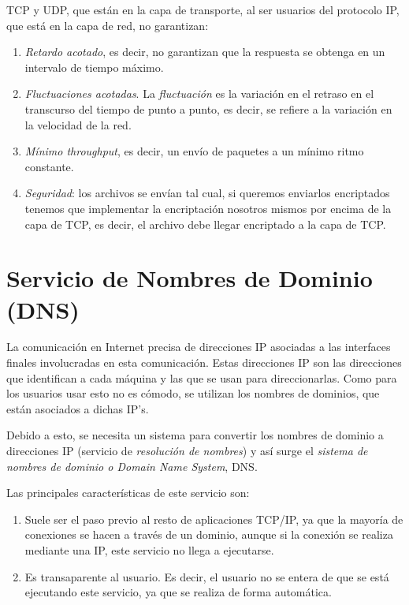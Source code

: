 \documentclass[10pt,a4paper,spanish]{report}
\begin{document}
TCP y UDP, que están en la capa de transporte, al ser usuarios del protocolo IP, que está en la capa de red, no garantizan:
\begin{enumerate}[\color{tema2}{$\bullet$}]
  \item \textit{\textcolor{tema2}{Retardo acotado}}, es decir, no garantizan que la respuesta se obtenga en un intervalo de tiempo máximo.
  \item \textit{\textcolor{tema2}{Fluctuaciones acotadas}}. La \textit{\textcolor{tema2}{fluctuación}} es  la variación en el retraso en el transcurso del tiempo de punto a punto, es decir, se refiere a la variación en la velocidad de la red.
  \item \textit{\textcolor{tema2}{Mínimo throughput}}, es decir, un envío de paquetes a  un mínimo ritmo constante.
  \item \textit{\textcolor{tema2}{Seguridad}}: los archivos se envían tal cual, si queremos enviarlos encriptados tenemos que implementar la encriptación nosotros mismos por encima de la capa de TCP, es decir, el archivo debe llegar encriptado a la capa de TCP.
\end{enumerate}

\section{\textcolor{tema2}Servicio de Nombres de Dominio (DNS)}

La comunicación en Internet precisa de direcciones IP asociadas a las interfaces finales involucradas en esta comunicación. Estas direcciones IP son las direcciones que identifican a cada máquina y las que se usan para direccionarlas. Como para los usuarios usar esto no es cómodo, se utilizan los nombres de dominios, que están asociados a dichas IP's. 

Debido a esto, se necesita un sistema para convertir los nombres de dominio a direcciones IP (servicio de \textit{\textcolor{tema2}{resolución de nombres}}) y así surge el \textit{\textcolor{tema2}{sistema de nombres de dominio o Domain Name System}}, DNS.

Las principales características de este servicio son:
\begin{enumerate}[\color{tema2}{$\spadesuit$}]
  \item Suele ser el paso previo al resto de aplicaciones TCP/IP, ya que la mayoría de conexiones se hacen a través de un dominio, aunque si la conexión se realiza mediante una IP, este servicio no llega a ejecutarse.
  \item Es transaparente al usuario. Es decir, el usuario no se entera de que se está ejecutando este servicio, ya que se realiza de forma automática.
\end{enumerate}
\end{document}
